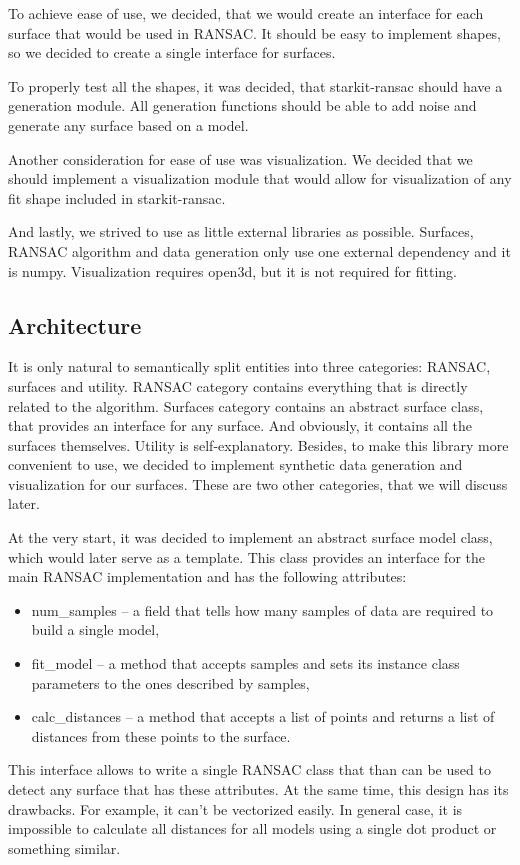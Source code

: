 \documentclass[10pt,conference,a4paper]{IEEEtran_EDM}
\begin{document}
To achieve ease of use, we decided, that we would create an interface for each
surface that would be used in RANSAC. It should be easy to implement shapes, so
we decided to create a single interface for surfaces.

To properly test all the shapes, it was decided, that starkit-ransac should
have a generation module. All generation functions should be able to add noise
and generate any surface based on a model.

Another consideration for ease of use was visualization. We decided that we
should implement a visualization module that would allow for visualization of
any fit shape included in starkit-ransac.

And lastly, we strived to use as little external libraries as possible.
Surfaces, RANSAC algorithm and data generation only use one external dependency
and it is numpy. Visualization requires open3d, but it is not required for
fitting.

\subsection{Architecture}
It is only natural to semantically split entities into three categories:
RANSAC, surfaces and utility. RANSAC category contains everything that is
directly related to the algorithm. Surfaces category contains an abstract
surface class, that provides an interface for any surface. And obviously, it
contains all the surfaces themselves. Utility is self-explanatory.
Besides, to make this library more convenient to use, we decided to implement
synthetic data generation and visualization for our surfaces. These are two
other categories, that we will discuss later.

At the very start, it was decided to implement an abstract surface model class, which
would later serve as a template. This class provides an interface for the main
RANSAC implementation and has the following attributes:
\begin{itemize}
    \item num\_samples -- a field that tells how many samples of data are
        required to build a single model,
    \item fit\_model -- a method that accepts samples and sets its instance
        class parameters to the ones described by samples,
    \item calc\_distances -- a method that accepts a list of points and returns
        a list of distances from these points to the surface.
\end{itemize}
This interface allows to write a single RANSAC class that than can be used to
detect any surface that has these attributes. At the same time, this design has
its drawbacks. For example, it can't be vectorized easily. In general case, it
is impossible to calculate all distances for all models using a single dot
product or something similar.
\end{document}

